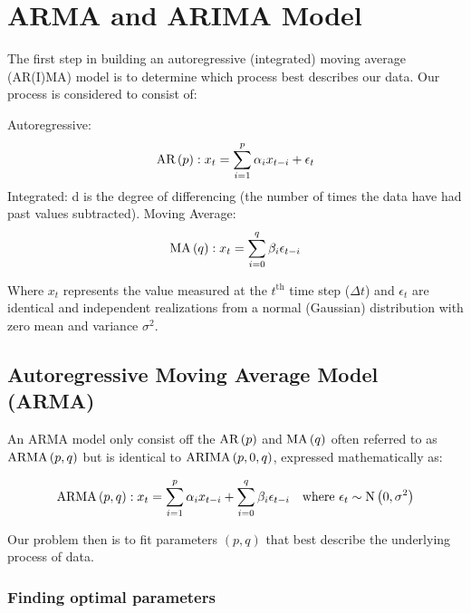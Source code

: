\section{ARMA and ARIMA Model}

The first step in building an autoregressive (integrated) moving average (AR(I)MA) model is to determine which process best describes our data. Our process is considered to consist of:

\begin{multicols}{3}
    Autoregressive:
    \begin{equation*}
        \text{AR}\left(p\right): x_t = \sum_{i=1}^p\alpha_ix_{t-i} + \epsilon_t
    \end{equation*}
    \vfill
    \columnbreak
    \noindent Integrated: d is the degree of differencing (the number of times the data have had past values subtracted).
    \vfill
    \columnbreak
    Moving Average:
    \begin{equation*}
        \text{MA}\left(q\right): x_t = \sum_{i=0}^q\beta_i\epsilon_{t-i}
    \end{equation*}
    \vfill
    \columnbreak
\end{multicols}

Where $x_t$ represents the value measured at the $t^{\text{th}}$ time step ($\Delta t$) and $\epsilon_t$ are identical and independent realizations from a normal (Gaussian) distribution with zero mean and variance $\sigma^2$. 

\subsection{Autoregressive Moving Average Model (ARMA)}

An ARMA model only consist off the $\text{AR}\left(p\right)$ and $\text{MA}\left(q\right)$ often referred to as $\text{ARMA}\left(p,q\right)$ but is identical to \break$\text{ARIMA}\left(p,0,q\right)$, expressed mathematically as:

\begin{equation*}
   \text{ARMA}\left(p,q\right) : x_t  = \sum_{i=1}^p\alpha_ix_{t-i} + \sum_{i=0}^q\beta_i\epsilon_{t-i} \quad \text{where } \epsilon_t \sim \text{N}\left(0, \sigma^2\right)
\end{equation*}

Our problem then is to fit parameters $(p,q)$ that best describe the underlying process of data.

\subsubsection{Finding optimal parameters}\label{SSec:fop1}

